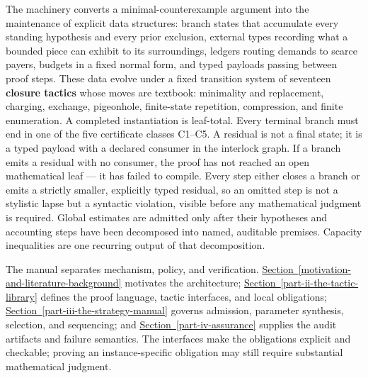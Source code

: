 \documentclass[
  11pt,
]{article}
\theoremstyle{definition}
\newcommand{\secref}[1]{\hyperref[#1]{Section~\ref*{#1}}}
\begin{document}
The machinery converts a minimal-counterexample argument into the
maintenance of explicit data structures: branch states that accumulate
every standing hypothesis and every prior exclusion, external types
recording what a bounded piece can exhibit to its surroundings, ledgers
routing demands to scarce payers, budgets in a fixed normal form, and
typed payloads passing between proof steps. These data evolve under a
fixed transition system of seventeen
\textbf{closure tactics} whose moves are textbook: minimality and
replacement, charging, exchange, pigeonhole, finite-state repetition,
compression, and finite enumeration. A completed instantiation is
leaf-total. Every terminal branch must end in one of the five certificate
classes C1--C5. A residual is not a final state; it is a typed payload
with a declared consumer in the interlock graph. If a branch emits a
residual with no consumer, the proof has not reached an open
mathematical leaf --- it has failed to compile. Every step either closes
a branch or emits a strictly smaller, explicitly typed residual, so an
omitted step is not a stylistic lapse but a syntactic violation, visible
before any mathematical judgment is required. Global estimates are
admitted only after their hypotheses and accounting steps have been
decomposed into named, auditable premises. Capacity inequalities are one
recurring output of that decomposition.

The manual separates mechanism, policy, and verification.
\secref{motivation-and-literature-background} motivates the architecture;
\secref{part-ii-the-tactic-library} defines the proof language, tactic
interfaces, and local obligations; \secref{part-iii-the-strategy-manual}
governs admission, parameter synthesis, selection, and sequencing; and
\secref{part-iv-assurance} supplies the audit artifacts and failure
semantics. The interfaces make the obligations explicit and checkable;
proving an instance-specific obligation may still require substantial
mathematical judgment.
\end{document}
